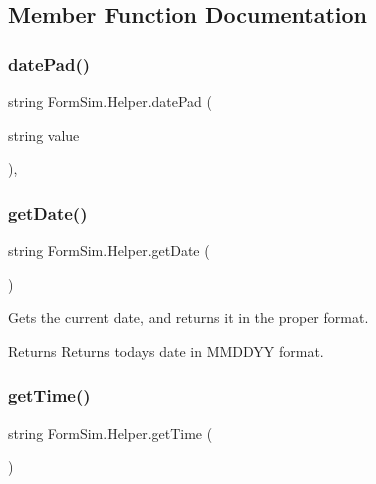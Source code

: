 \subsection{Member Function Documentation}
\mbox{\label{class_form_sim_1_1_helper_a5c4a7f2cdee7bb6466b8dd9f7ea11745}} 
\subsubsection{\texorpdfstring{date\+Pad()}{datePad()}}
{\footnotesize\ttfamily string Form\+Sim.\+Helper.\+date\+Pad (\begin{DoxyParamCaption}\item[{string}]{value }\end{DoxyParamCaption})\hspace{0.3cm}{\ttfamily [inline]}, {\ttfamily [private]}}

\mbox{\label{class_form_sim_1_1_helper_a3968424b9dab262dce2c066807926c77}} 
\subsubsection{\texorpdfstring{get\+Date()}{getDate()}}
{\footnotesize\ttfamily string Form\+Sim.\+Helper.\+get\+Date (\begin{DoxyParamCaption}{ }\end{DoxyParamCaption})\hspace{0.3cm}{\ttfamily [inline]}}



Gets the current date, and returns it in the proper format. 

\begin{DoxyReturn}{Returns}
Returns todays date in M\+M\+D\+D\+YY format.
\end{DoxyReturn}
\mbox{\label{class_form_sim_1_1_helper_a1bfb27c73d68bbcd7224e5f041ba3606}} 
\subsubsection{\texorpdfstring{get\+Time()}{getTime()}}
{\footnotesize\ttfamily string Form\+Sim.\+Helper.\+get\+Time (\begin{DoxyParamCaption}{ }\end{DoxyParamCaption})\hspace{0.3cm}{\ttfamily [inline]}}



